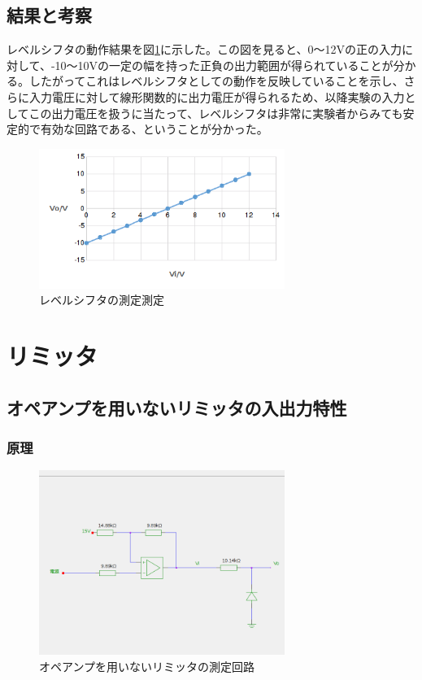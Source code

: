 \documentclass[11pt,a4j]{jsarticle}
\begin{document}
   
  \subsection{結果と考察}
  レベルシフタの動作結果を図\ref{fig:1_0}に示した。この図を見ると、0～12Vの正の入力に対して、-10～10Vの一定の幅を持った正負の出力範囲が得られていることが分かる。したがってこれはレベルシフタとしての動作を反映していることを示し、さらに入力電圧に対して線形関数的に出力電圧が得られるため、以降実験の入力としてこの出力電圧を扱うに当たって、レベルシフタは非常に実験者からみても安定的で有効な回路である、ということが分かった。
  
   \begin{figure}[htbp]
  \centering
  \includegraphics[width=8cm,clip]{1_0.png}
  \caption{レベルシフタの測定測定}
  \label{fig:1_0}
 \end{figure}%
   
   \clearpage
   
 \section{リミッタ}
  \subsection{オペアンプを用いないリミッタの入出力特性}
   \subsubsection{原理}
    
    \begin{figure}[htbp]
  \centering
  \includegraphics[width=8cm,clip]{noamp_tokusei.png}
  \caption{オペアンプを用いないリミッタの測定回路}
  \label{fig:noamp_tokusei}
 \end{figure}%
    
\end{document}
